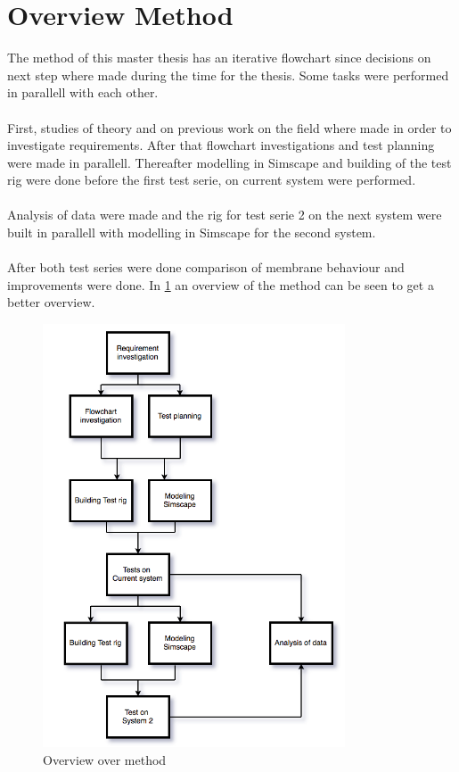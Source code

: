 \section{Overview Method}
The method of this master thesis has an iterative flowchart since decisions on next step where made during the time for the thesis. Some tasks were performed in parallell with each other.\\
\\
First, studies of theory and on previous work on the field where made in order to investigate requirements. After that flowchart investigations and test planning were made in parallell. Thereafter modelling in Simscape and building of the test rig were done before the first test serie, on current system were performed.\\
\\
Analysis of data were made and the rig for test serie 2 on the next system were built in parallell with modelling in Simscape for the second system. \\
\\
After both test series were done comparison of membrane behaviour and improvements were done. In \ref{fig:metod} an overview of the method can be seen to get a better overview.

\begin{figure}[h]
    \centering
    \includegraphics[width=0.8\textwidth]{Metod}
    \caption{Overview over method}
    \label{fig:metod}
\end{figure}\newpage




